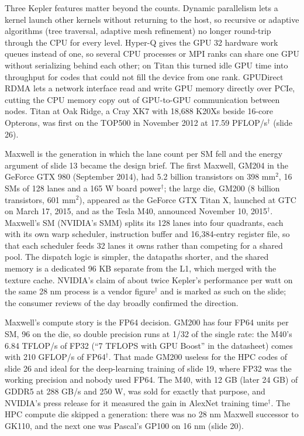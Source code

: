 \documentclass[11pt,letterpaper]{article}
\begin{document}
Three Kepler features matter beyond the counts. Dynamic parallelism lets a kernel launch other kernels without returning to the host, so recursive or adaptive algorithms (tree traversal, adaptive mesh refinement) no longer round-trip through the CPU for every level. Hyper-Q gives the GPU 32 hardware work queues instead of one, so several CPU processes or MPI ranks can share one GPU without serializing behind each other; on Titan this turned idle GPU time into throughput for codes that could not fill the device from one rank. GPUDirect RDMA lets a network interface read and write GPU memory directly over PCIe, cutting the CPU memory copy out of GPU-to-GPU communication between nodes. Titan at Oak Ridge, a Cray XK7 with 18,688 K20Xs beside 16-core Opterons, was first on the TOP500 in November 2012 at 17.59 PFLOP/s$^\dagger$ (slide 26).

Maxwell is the generation in which the lane count per SM fell and the energy argument of slide 13 became the design brief. The first Maxwell, GM204 in the GeForce GTX 980 (September 2014), had 5.2 billion transistors on 398 mm$^2$, 16 SMs of 128 lanes and a 165 W board power$^\dagger$; the large die, GM200 (8 billion transistors, 601 mm$^2$), appeared as the GeForce GTX Titan X, launched at GTC on March 17, 2015, and as the Tesla M40, announced November 10, 2015$^\dagger$. Maxwell's SM (NVIDIA's SMM) splits its 128 lanes into four quadrants, each with its own warp scheduler, instruction buffer and 16,384-entry register file, so that each scheduler feeds 32 lanes it owns rather than competing for a shared pool. The dispatch logic is simpler, the datapaths shorter, and the shared memory is a dedicated 96 KB separate from the L1, which merged with the texture cache. NVIDIA's claim of about twice Kepler's performance per watt on the same 28 nm process is a vendor figure$^\dagger$ and is marked as such on the slide; the consumer reviews of the day broadly confirmed the direction.

Maxwell's compute story is the FP64 decision. GM200 has four FP64 units per SM, 96 on the die, so double precision runs at 1/32 of the single rate: the M40's 6.84 TFLOP/s of FP32 (``7 TFLOPS with GPU Boost'' in the datasheet) comes with 210 GFLOP/s of FP64$^\dagger$. That made GM200 useless for the HPC codes of slide 26 and ideal for the deep-learning training of slide 19, where FP32 was the working precision and nobody used FP64. The M40, with 12 GB (later 24 GB) of GDDR5 at 288 GB/s and 250 W, was sold for exactly that purpose, and NVIDIA's press release for it measured the gain in AlexNet training time$^\dagger$. The HPC compute die skipped a generation: there was no 28 nm Maxwell successor to GK110, and the next one was Pascal's GP100 on 16 nm (slide 20).
\end{document}
